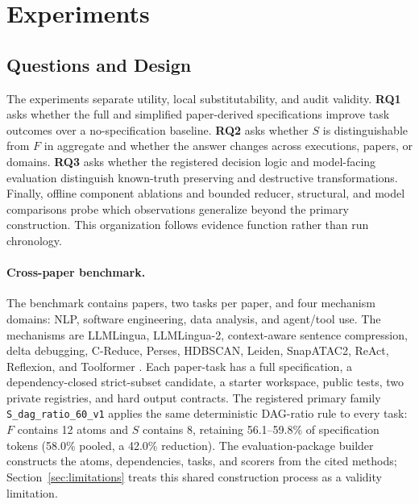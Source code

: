 \section{Experiments}

\subsection{Questions and Design}

The experiments separate utility, local substitutability, and audit validity. \textbf{RQ1} asks whether the full and simplified paper-derived specifications improve task outcomes over a no-specification baseline. \textbf{RQ2} asks whether $S$ is distinguishable from $F$ in aggregate and whether the answer changes across executions, papers, or domains. \textbf{RQ3} asks whether the registered decision logic and model-facing evaluation distinguish known-truth preserving and destructive transformations. Finally, offline component ablations and bounded reducer, structural, and model comparisons probe which observations generalize beyond the primary construction. This organization follows evidence function rather than run chronology.

\paragraph{Cross-paper benchmark.}
The benchmark contains \PrimaryPapers{} papers, two tasks per paper, and four mechanism domains: NLP, software engineering, data analysis, and agent/tool use. The mechanisms are LLMLingua, LLMLingua-2, context-aware sentence compression, delta debugging, C-Reduce, Perses, HDBSCAN, Leiden, SnapATAC2, ReAct, Reflexion, and Toolformer \cite{jiang2023llmlingua,pan2024llmlingua2,liskavets2025contextcompression,zeller2002simplifying,regehr2012creduce,sun2018perses,campello2015hdbscan,traag2019leiden,zhang2024snapatac2,yao2023react,shinn2023reflexion,schick2023toolformer}. Each paper-task has a full specification, a dependency-closed strict-subset candidate, a starter workspace, public tests, two private registries, and hard output contracts. The registered primary family \texttt{S\_dag\_ratio\_60\_v1} applies the same deterministic DAG-ratio rule to every task: $F$ contains 12 atoms and $S$ contains 8, retaining 56.1--59.8\% of specification tokens (58.0\% pooled, a 42.0\% reduction). The evaluation-package builder constructs the atoms, dependencies, tasks, and scorers from the cited methods; Section~\ref{sec:limitations} treats this shared construction process as a validity limitation.

